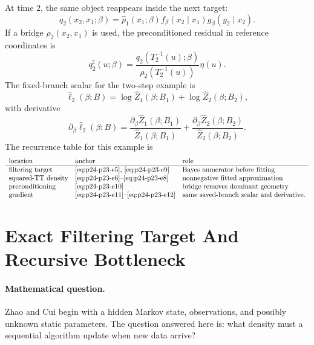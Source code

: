 \documentclass[11pt]{article}
\numberwithin{equation}{section}
\begin{document}
At time \(2\), the same object reappears inside the next target:
\begin{equation}
    q_2(x_2,x_1;\beta)
    =
    \widehat p_1(x_1;\beta)
    f_\beta(x_2\mid x_1)
    g_\beta(y_2\mid x_2).
    \label{eq:p24-p23-e9}
\end{equation}
If a bridge \(\rho_2(x_2,x_1)\) is used, the preconditioned residual in
reference coordinates is
\begin{equation}
    q_2^\sharp(u;\beta)
    =
    \frac{q_2(T_2^{-1}(u);\beta)}
    {\rho_2(T_2^{-1}(u))}
    \eta(u).
    \label{eq:p24-p23-e10}
\end{equation}
The fixed-branch scalar for the two-step example is
\begin{equation}
    \widehat\ell_2(\beta;B)
    =
    \log\widehat Z_1(\beta;B_1)
    +
    \log\widehat Z_2(\beta;B_2),
    \label{eq:p24-p23-e11}
\end{equation}
with derivative
\begin{equation}
    \partial_\beta\widehat\ell_2(\beta;B)
    =
    \frac{\partial_\beta\widehat Z_1(\beta;B_1)}
    {\widehat Z_1(\beta;B_1)}
    +
    \frac{\partial_\beta\widehat Z_2(\beta;B_2)}
    {\widehat Z_2(\beta;B_2)}.
    \label{eq:p24-p23-e12}
\end{equation}
The recurrence table for this example is
\begin{equation}
\begin{array}{lll}
\text{location} & \text{anchor} & \text{role}\\
\hline
\text{filtering target} & \text{\eqref{eq:p24-p23-e5}, \eqref{eq:p24-p23-e9}} &
    \text{Bayes numerator before fitting}\\
\text{squared-TT density} & \text{\eqref{eq:p24-p23-e6}--\eqref{eq:p24-p23-e8}} &
    \text{nonnegative fitted approximation}\\
\text{preconditioning} & \text{\eqref{eq:p24-p23-e10}} &
    \text{bridge removes dominant geometry}\\
\text{gradient} & \text{\eqref{eq:p24-p23-e11}--\eqref{eq:p24-p23-e12}} &
    \text{same saved-branch scalar and derivative.}
\end{array}
\label{eq:p24-p23-e13}
\end{equation}

\section{Exact Filtering Target And Recursive Bottleneck}

\paragraph{Mathematical question.}
Zhao and Cui \cite{zhao2024ttsequential} begin with a hidden Markov state, observations, and possibly unknown
static parameters.  The question answered here is: what density must a
sequential algorithm update when new data arrive?
\end{document}
